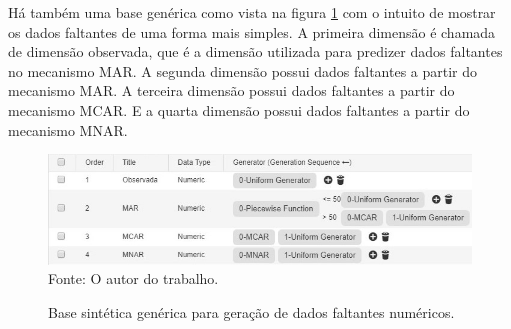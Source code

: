 \documentclass[
	12pt,				%
	openright,			%
	oneside,			%
	a4paper,			%
	english,			%
	brazil				%
	]{abntex2}
\begin{document}
		Há também uma base genérica como vista na figura \ref{fig:BaseGenerica} com o intuito de mostrar os dados faltantes de uma forma mais simples.
		A primeira dimensão é chamada de dimensão observada, que é a dimensão utilizada para predizer dados faltantes no mecanismo MAR.
		A segunda dimensão possui dados faltantes a partir do mecanismo MAR.
		A terceira dimensão possui dados faltantes a partir do mecanismo MCAR. 
		E a quarta dimensão possui dados faltantes a partir do mecanismo MNAR.

		\begin{figure}[h!]
			\centering
			\caption{Base sintética genérica para geração de dados faltantes numéricos.}
			\includegraphics[width=\linewidth]{./figures/Resultados/BaseGenericaModelo.jpg}
			\label{fig:BaseGenerica}
			\footnotesize Fonte: O autor do trabalho.
		\end{figure}
\end{document}
